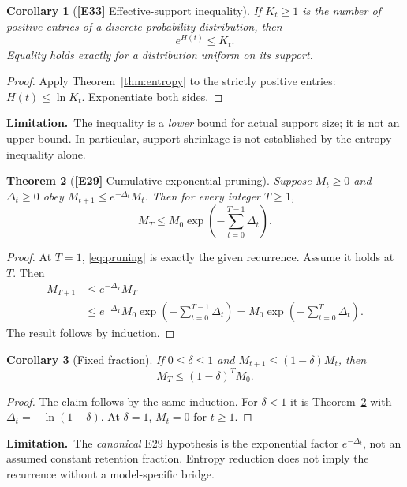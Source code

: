 \documentclass[11pt,letterpaper]{article}
\newtheorem{theorem}{Theorem}[section]
\newtheorem{corollary}[theorem]{Corollary}
\theoremstyle{definition}
\theoremstyle{remark}
\newcommand{\id}[1]{\textnormal{\textbf{[#1]}}}
\newcommand{\scope}{\par\smallskip\noindent\textbf{Limitation.}\ }
\begin{document}
\begin{corollary}[\id{E33} Effective-support inequality]\label{cor:support}
If $K_t\ge1$ is the number of positive entries of a discrete
probability distribution, then
\begin{equation}
\boxed{e^{H(t)}\le K_t}.
\end{equation}
Equality holds exactly for a distribution uniform on its support.
\end{corollary}
\begin{proof}
Apply Theorem~\ref{thm:entropy} to the strictly positive entries:
$H(t)\le\ln K_t$. Exponentiate both sides.
\end{proof}
\scope The inequality is a \emph{lower} bound for actual support size;
it is not an upper bound. In particular, support shrinkage is not
established by the entropy inequality alone.

\begin{theorem}[\id{E29} Cumulative exponential pruning]\label{thm:pruning}
Suppose $M_t\ge0$ and $\Delta_t\ge0$ obey
$M_{t+1}\le e^{-\Delta_t}M_t$. Then for every integer $T\ge1$,
\begin{equation}\label{eq:pruning}
\boxed{M_T\le M_0\exp\left(-\sum_{t=0}^{T-1}\Delta_t\right)}.
\end{equation}
\end{theorem}
\begin{proof}
At $T=1$, \eqref{eq:pruning} is exactly the given recurrence.
Assume it holds at $T$. Then
\begin{align*}
M_{T+1}&\le e^{-\Delta_T}M_T\\
&\le e^{-\Delta_T}M_0
\exp\left(-\sum_{t=0}^{T-1}\Delta_t\right)
=M_0\exp\left(-\sum_{t=0}^{T}\Delta_t\right).
\end{align*}
The result follows by induction.
\end{proof}
\begin{corollary}[Fixed fraction]
If $0\le\delta\le1$ and $M_{t+1}\le(1-\delta)M_t$, then
\begin{equation*}
M_T\le(1-\delta)^TM_0.
\end{equation*}
\end{corollary}
\begin{proof}
The claim follows by the same induction. For $\delta<1$ it is
Theorem~\ref{thm:pruning} with $\Delta_t=-\ln(1-\delta)$.
At $\delta=1$, $M_t=0$ for $t\ge1$.
\end{proof}
\scope The \emph{canonical} E29 hypothesis is the exponential factor
$e^{-\Delta_t}$, not an assumed constant retention fraction. Entropy
reduction does not imply the recurrence without a model-specific bridge.
\end{document}
